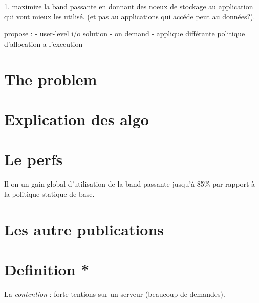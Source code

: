 \documentclass[10pt, a4paper]{article}
\begin{document}
1. maximize la band passante en donnant des noeux de stockage au application qui vont mieux les utilisé. (et pas au applications qui accéde peut au données?).

propose :
- user-level i/o solution
- on demand
- applique différante politique d'allocation a l'execution
- 


\section{The problem}

\section{Explication des algo}


\section{Le perfs}

Il on un gain global d'utilisation de la band passante jusqu'à 85\% par rapport à la politique statique de base.

\section{Les autre publications}


\section{Definition *}

La \emph{contention} : forte tentions sur un serveur (beaucoup de demandes).
\end{document}
